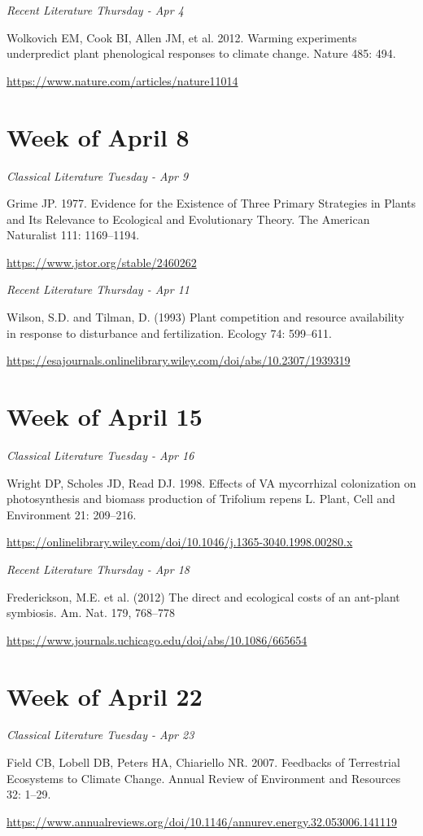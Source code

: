 \documentclass[12pt, notitlepage]{article}   	%
\begin{document}
{\textit{Recent Literature Thursday - Apr 4} \par
Wolkovich EM, Cook BI, Allen JM, et al. 2012. 
Warming experiments underpredict plant phenological responses to climate change. 
Nature 485: 494. \par
\url{https://www.nature.com/articles/nature11014}

\section*{Week of April 8}
\textit{Classical Literature Tuesday - Apr 9} \par
Grime JP. 1977. Evidence for the Existence of Three Primary Strategies in Plants and Its 
Relevance to Ecological and Evolutionary Theory. 
The American Naturalist 111: 1169–1194. \par
\url{https://www.jstor.org/stable/2460262}

\textit{Recent Literature Thursday - Apr 11} \par
Wilson, S.D. and Tilman, D. (1993) Plant competition and resource availability in 
response to disturbance and fertilization. Ecology 74: 599–611. \par
\url{https://esajournals.onlinelibrary.wiley.com/doi/abs/10.2307/1939319}

\section*{Week of April 15}
\textit{Classical Literature Tuesday - Apr 16} \par
Wright DP, Scholes JD, Read DJ. 1998. Effects of VA mycorrhizal colonization on 
photosynthesis and biomass production of Trifolium repens L. 
Plant, Cell and Environment 21: 209–216. \par
\url{https://onlinelibrary.wiley.com/doi/10.1046/j.1365-3040.1998.00280.x}

\textit{Recent Literature Thursday - Apr 18} \par
Frederickson, M.E. et al. (2012) The direct and ecological costs of an ant-plant symbiosis. 
Am. Nat. 179, 768–778 \par
\url{https://www.journals.uchicago.edu/doi/abs/10.1086/665654}

\section*{Week of April 22}
\textit{Classical Literature Tuesday - Apr 23} \par
Field CB, Lobell DB, Peters HA, Chiariello NR. 2007. Feedbacks of Terrestrial Ecosystems 
to Climate Change. Annual Review of Environment and Resources 32: 1–29. \par
\url{https://www.annualreviews.org/doi/10.1146/annurev.energy.32.053006.141119}

}
\end{document}
